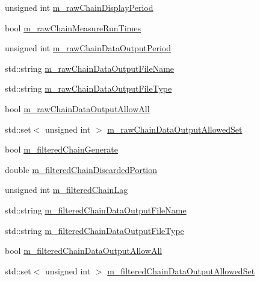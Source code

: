 \begin{DoxyCompactItemize}
\item 
unsigned int \hyperlink{class_q_u_e_s_o_1_1_mh_options_values_a6d11f0ea62107b789da99befe29ebffa}{m\-\_\-raw\-Chain\-Display\-Period}
\item 
bool \hyperlink{class_q_u_e_s_o_1_1_mh_options_values_a6fcc2efc9146b68548e62d707aeed883}{m\-\_\-raw\-Chain\-Measure\-Run\-Times}
\item 
unsigned int \hyperlink{class_q_u_e_s_o_1_1_mh_options_values_ad838a3095d5158e27b9af55597822d31}{m\-\_\-raw\-Chain\-Data\-Output\-Period}
\item 
std\-::string \hyperlink{class_q_u_e_s_o_1_1_mh_options_values_a0ff310cdab62e1bdbff8663f8a6b1c77}{m\-\_\-raw\-Chain\-Data\-Output\-File\-Name}
\item 
std\-::string \hyperlink{class_q_u_e_s_o_1_1_mh_options_values_ae435f8be38f9f6407a2e0f75c53b4e76}{m\-\_\-raw\-Chain\-Data\-Output\-File\-Type}
\item 
bool \hyperlink{class_q_u_e_s_o_1_1_mh_options_values_a7bd5a3926443946479ea617918d6723f}{m\-\_\-raw\-Chain\-Data\-Output\-Allow\-All}
\item 
std\-::set$<$ unsigned int $>$ \hyperlink{class_q_u_e_s_o_1_1_mh_options_values_a99f722385d57bcb24542f3969c3764cd}{m\-\_\-raw\-Chain\-Data\-Output\-Allowed\-Set}
\item 
bool \hyperlink{class_q_u_e_s_o_1_1_mh_options_values_afe02816132a862e807ea3675b4125ccb}{m\-\_\-filtered\-Chain\-Generate}
\item 
double \hyperlink{class_q_u_e_s_o_1_1_mh_options_values_afdaa37947c3a5c5acc11b89fa0a98fb9}{m\-\_\-filtered\-Chain\-Discarded\-Portion}
\item 
unsigned int \hyperlink{class_q_u_e_s_o_1_1_mh_options_values_abd87b32b15f3ce695d910b48d837094f}{m\-\_\-filtered\-Chain\-Lag}
\item 
std\-::string \hyperlink{class_q_u_e_s_o_1_1_mh_options_values_a337b2f1161814f1c52153cbe7706f59a}{m\-\_\-filtered\-Chain\-Data\-Output\-File\-Name}
\item 
std\-::string \hyperlink{class_q_u_e_s_o_1_1_mh_options_values_adc3052dc0f1c2fd5072cb415a0eb3265}{m\-\_\-filtered\-Chain\-Data\-Output\-File\-Type}
\item 
bool \hyperlink{class_q_u_e_s_o_1_1_mh_options_values_a249e8720b4570d5f4e6504a29a84ac04}{m\-\_\-filtered\-Chain\-Data\-Output\-Allow\-All}
\item 
std\-::set$<$ unsigned int $>$ \hyperlink{class_q_u_e_s_o_1_1_mh_options_values_ab465e2184857848c2276578b2b08baab}{m\-\_\-filtered\-Chain\-Data\-Output\-Allowed\-Set}

\end{DoxyCompactItemize}
